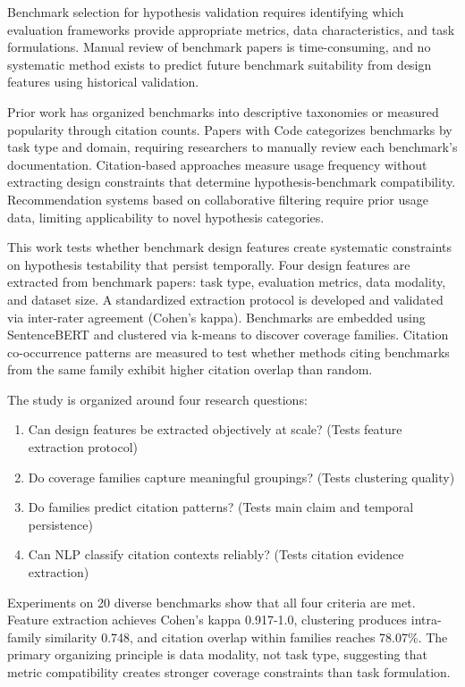 
Benchmark selection for hypothesis validation requires identifying which evaluation frameworks provide appropriate metrics, data characteristics, and task formulations. Manual review of benchmark papers is time-consuming, and no systematic method exists to predict future benchmark suitability from design features using historical validation.

Prior work has organized benchmarks into descriptive taxonomies or measured popularity through citation counts. Papers with Code categorizes benchmarks by task type and domain, requiring researchers to manually review each benchmark's documentation. Citation-based approaches measure usage frequency without extracting design constraints that determine hypothesis-benchmark compatibility. Recommendation systems based on collaborative filtering require prior usage data, limiting applicability to novel hypothesis categories.

This work tests whether benchmark design features create systematic constraints on hypothesis testability that persist temporally. Four design features are extracted from benchmark papers: task type, evaluation metrics, data modality, and dataset size. A standardized extraction protocol is developed and validated via inter-rater agreement (Cohen's kappa). Benchmarks are embedded using SentenceBERT and clustered via k-means to discover coverage families. Citation co-occurrence patterns are measured to test whether methods citing benchmarks from the same family exhibit higher citation overlap than random.

The study is organized around four research questions:

\begin{enumerate}
\item Can design features be extracted objectively at scale? (Tests feature extraction protocol)
\item Do coverage families capture meaningful groupings? (Tests clustering quality)
\item Do families predict citation patterns? (Tests main claim and temporal persistence)
\item Can NLP classify citation contexts reliably? (Tests citation evidence extraction)
\end{enumerate}

Experiments on 20 diverse benchmarks show that all four criteria are met. Feature extraction achieves Cohen's kappa 0.917-1.0, clustering produces intra-family similarity 0.748, and citation overlap within families reaches 78.07\%. The primary organizing principle is data modality, not task type, suggesting that metric compatibility creates stronger coverage constraints than task formulation.
